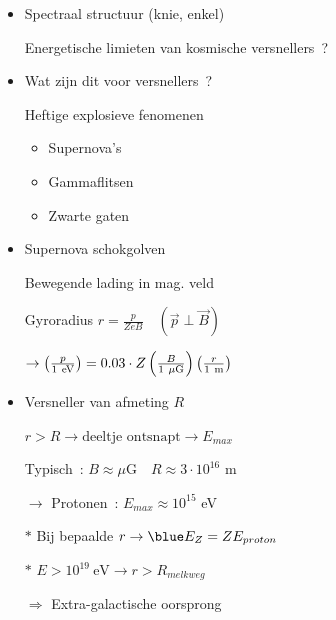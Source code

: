 \newpage

\vspace*{3cm}
\begin{itemize}
\item Spectraal structuur (knie, enkel)
\item[] Energetische limieten van kosmische versnellers~?
\item Wat zijn dit voor versnellers~?
\item[] Heftige explosieve fenomenen
\begin{itemize}
\item Supernova's
\item Gammaflitsen
\item Zwarte gaten
\end{itemize}
\end{itemize}

\Tr
\begin{itemize}
\item Supernova schokgolven
\item[] Bewegende lading in mag. veld
\item[] Gyroradius $r=\frac{p}{ZeB} \quad (\vec{p} \perp \vec{B})$
\item[] $\rightarrow
         \left(\frac{p}{1~\rm{eV}}\right)=0.03 \cdot Z\left(\frac{B}{1~\mu\rm{G}}\right)
         \left(\frac{r}{1~\rm{m}}\right)$
\item Versneller van afmeting $R$
\item[] $r > R \rightarrow \text{deeltje~ontsnapt} \rightarrow E_{max}$
\item[] Typisch~: $B \approx \mu\text{G} \quad R \approx 3 \cdot 10^{16}$ m
\item[] $\rightarrow$ Protonen~: $E_{max} \approx 10^{15}$ eV
\item[$\ast$] Bij bepaalde $r \rightarrow {\blue E_{Z}=Z E_{proton}}$
\item[$\ast$] $E>10^{19}~\text{eV} \rightarrow r>R_{melkweg}$
\item[] $\Rightarrow$ Extra-galactische oorsprong
\end{itemize}

